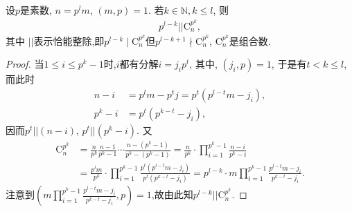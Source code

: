 \documentclass[../../main.tex]{subfiles}%
\begin{document}
\begin{lemma}\label{lemma:Sylow定理证明引理1}
设$p$是素数, $n=p^lm$, $(m,p)=1$. 若$k\in\mathbb{N}, k\leqslant l$, 则
\begin{align*}
p^{l-k}||\mathrm{C}_n^{p^k}, 
\end{align*}
其中 $||$表示恰能整除,即$p^{l-k}\mid \mathrm{C}_n^{p^k}$但$p^{l-k+1}\nmid \mathrm{C}_n^{p^k}$, $\mathrm{C}_n^{p^k}$是组合数.
\end{lemma}
\begin{proof}
当$1\leqslant i\leqslant p^k-1$时,$i$都有分解$i=j_ip^t$, 其中, $(j_i,p)=1$, 于是有$t<k\leqslant l$, 而此时
\begin{align*}
n-i&=p^lm-p^tj=p^t(p^{l-t}m-j_i), \\
p^k-i&=p^t(p^{k-t}-j_i),
\end{align*}
因而$p^t||(n-i)$, $p^t||(p^k-i)$. 又
\begin{align*}
\mathrm{C}_{n}^{p^k}&=\frac{n}{p^k}\frac{n-1}{p^k-1}\cdots \frac{n-(p^k-1)}{p^k-(p^k-1)}=\frac{n}{p^k}\cdot \prod_{i=1}^{p^k-1}{\frac{n-i}{p^k-i}}
\\
&=\frac{p^lm}{p^k}\cdot \prod_{i=1}^{p^k-1}{\frac{p^t\left( p^{l-t}m-j_i \right)}{p^t\left( p^{k-t}-j_i \right)}}=p^{l-k}\cdot m\prod_{i=1}^{p^k-1}{\frac{p^{l-t}m-j_i}{p^{k-t}-j_i}}.
\end{align*}
注意到$(m\prod_{i=1}^{p^k-1}{\frac{p^{l-t}m-j_i}{p^{k-t}-j_i}},p)=1$,故由此知$p^{l-k}||\mathrm{C}_n^{p^k}$.
\end{proof}
\end{document}
